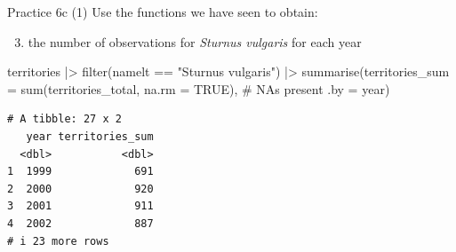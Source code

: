 \documentclass[
  ignorenonframetext,
  aspectratio=169,
  t]{beamer}
\newenvironment{Shaded}{\begin{snugshade}}{\end{snugshade}}
\newcommand{\AttributeTok}[1]{\textcolor[rgb]{0.40,0.45,0.13}{#1}}
\newcommand{\CommentTok}[1]{\textcolor[rgb]{0.37,0.37,0.37}{#1}}
\newcommand{\ConstantTok}[1]{\textcolor[rgb]{0.56,0.35,0.01}{#1}}
\newcommand{\FunctionTok}[1]{\textcolor[rgb]{0.28,0.35,0.67}{#1}}
\newcommand{\NormalTok}[1]{\textcolor[rgb]{0.00,0.23,0.31}{#1}}
\newcommand{\SpecialCharTok}[1]{\textcolor[rgb]{0.37,0.37,0.37}{#1}}
\newcommand{\StringTok}[1]{\textcolor[rgb]{0.13,0.47,0.30}{#1}}
\providecommand{\tightlist}{%
  \setlength{\itemsep}{0pt}\setlength{\parskip}{0pt}}
\begin{document}
\begin{frame}[fragile]{Practice 6c (1)}
\protect{}\label{practice-6c-1}
Use the functions we have seen to obtain:

\begin{enumerate}
\setcounter{enumi}{2}
\tightlist
\item
  the number of observations for \emph{Sturnus vulgaris} for each year
\end{enumerate}

\footnotesize

\begin{Shaded}
\begin{Highlighting}[]
\NormalTok{territories }\SpecialCharTok{|\textgreater{}} 
    \FunctionTok{filter}\NormalTok{(namelt }\SpecialCharTok{==} \StringTok{"Sturnus vulgaris"}\NormalTok{) }\SpecialCharTok{|\textgreater{}} 
    \FunctionTok{summarise}\NormalTok{(}\AttributeTok{territories\_sum =} \FunctionTok{sum}\NormalTok{(territories\_total, }\AttributeTok{na.rm =} \ConstantTok{TRUE}\NormalTok{), }\CommentTok{\# NAs present}
              \AttributeTok{.by =}\NormalTok{ year)}
\end{Highlighting}
\end{Shaded}

\begin{verbatim}
# A tibble: 27 x 2
   year territories_sum
  <dbl>           <dbl>
1  1999             691
2  2000             920
3  2001             911
4  2002             887
# i 23 more rows
\end{verbatim}

\normalsize
\end{frame}
\end{document}
